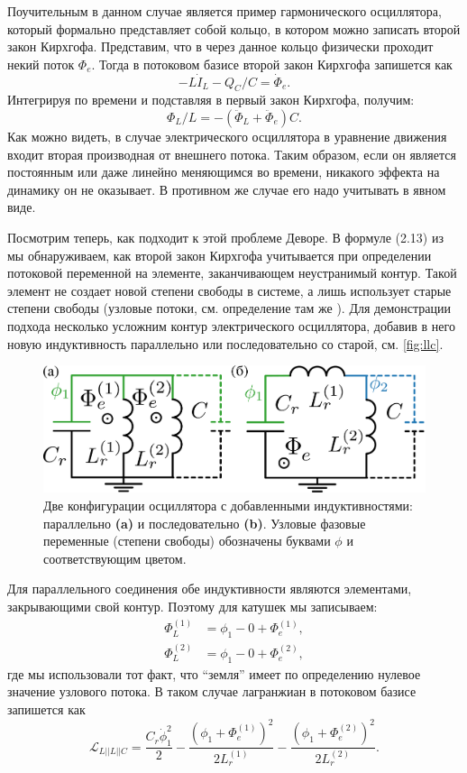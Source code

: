 \documentclass[14pt, a4paper]{extreport}
\numberwithin{equation}{section}
\begin{document}
Поучительным в данном случае является пример гармонического осциллятора, который формально представляет собой кольцо, в котором можно записать второй закон Кирхгофа. Представим, что в через данное кольцо физически проходит некий поток $\Phi_e$. Тогда в потоковом базисе второй закон Кирхгофа запишется как
\begin{equation}
	-L\dot I_L - Q_C/C = \dot \Phi_e.
\end{equation}
Интегрируя по времени и подставляя в первый закон Кирхгофа, получим:
\begin{equation}
	\Phi_L/L = - (\ddot \Phi_L + \ddot \Phi_e)C.
\end{equation}
Как можно видеть, в случае электрического осциллятора в уравнение движения входит вторая производная от внешнего потока. Таким образом, если он является постоянным или даже линейно меняющимся во времени, никакого эффекта на динамику он не оказывает. В противном же случае его надо учитывать в явном виде.

Посмотрим теперь, как подходит к этой проблеме Деворе. В формуле (2.13) из \cite{devoret1995quantum} мы обнаруживаем, как второй закон Кирхгофа учитывается при определении потоковой переменной на элементе, заканчивающем неустранимый контур. Такой элемент не создает новой степени свободы в системе, а лишь использует старые степени свободы (узловые потоки, см. определение там же \cite{devoret1995quantum}). Для демонстрации подхода несколько усложним контур электрического осциллятора, добавив в него новую индуктивность параллельно или последовательно со старой, см. \autoref{fig:llc}.
\begin{figure}
	\centering
	\includegraphics[width=0.8\linewidth]{Pictures/LLC}
	\caption{Две конфигурации осциллятора с добавленными индуктивностями: параллельно \textbf{(a)} и последовательно \textbf{(b)}. Узловые фазовые переменные (степени свободы) обозначены буквами $\phi$ и соответствующим цветом.}
	\label{fig:llc}
\end{figure}

Для параллельного соединения обе индуктивности являются элементами, закрывающими свой контур. Поэтому для катушек мы записываем:
\begin{align}
	\Phi_L^{(1)} &= \phi_1 - 0 + \Phi_e^{(1)},\\
	\Phi_L^{(2)} &= \phi_1 - 0 + \Phi_e^{(2)},
\end{align}
где мы использовали тот факт, что ``земля'' имеет по определению нулевое значение узлового потока. В таком случае лагранжиан в потоковом базисе запишется как 
\begin{equation}
	\mathcal{L}_{L||L||C} = \frac{C_r \dot\phi_1^2}{2} - \frac{\left(\phi_1 + \Phi_e^{(1)}\right)^2}{2L_r^{(1)}} - \frac{\left(\phi_1 + \Phi_e^{(2)}\right)^2}{2 L_r^{(2)}}.
\end{equation}
\end{document}

